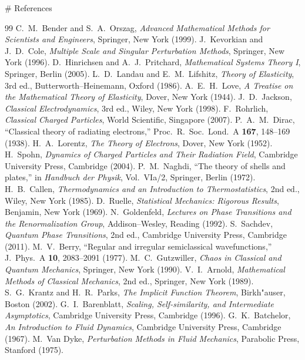 # References
\begin{thebibliography}{99}
C.~M.~Bender and S.~A.~Orszag,
\emph{Advanced Mathematical Methods for Scientists and Engineers},
Springer, New York (1999).
J.~Kevorkian and J.~D.~Cole,
\emph{Multiple Scale and Singular Perturbation Methods},
Springer, New York (1996).
D.~Hinrichsen and A.~J.~Pritchard,
\emph{Mathematical Systems Theory I},
Springer, Berlin (2005).
L.~D.~Landau and E.~M.~Lifshitz,
\emph{Theory of Elasticity},
3rd ed., Butterworth--Heinemann, Oxford (1986).
A.~E.~H.~Love,
\emph{A Treatise on the Mathematical Theory of Elasticity},
Dover, New York (1944).
J.~D.~Jackson,
\emph{Classical Electrodynamics},
3rd ed., Wiley, New York (1998).
F.~Rohrlich,
\emph{Classical Charged Particles},
World Scientific, Singapore (2007).
P.~A.~M.~Dirac,
``Classical theory of radiating electrons,''
Proc.\ R.\ Soc.\ Lond.\ A \textbf{167}, 148--169 (1938).
H.~A.~Lorentz,
\emph{The Theory of Electrons},
Dover, New York (1952).
H.~Spohn,
\emph{Dynamics of Charged Particles and Their Radiation Field},
Cambridge University Press, Cambridge (2004).
P.~M.~Naghdi,
``The theory of shells and plates,''
in \emph{Handbuch der Physik}, Vol.~VIa/2,
Springer, Berlin (1972).
H.~B.~Callen,
\emph{Thermodynamics and an Introduction to Thermostatistics},
2nd ed., Wiley, New York (1985).
D.~Ruelle,
\emph{Statistical Mechanics: Rigorous Results},
Benjamin, New York (1969).
N.~Goldenfeld,
\emph{Lectures on Phase Transitions and the Renormalization Group},
Addison--Wesley, Reading (1992).
S.~Sachdev,
\emph{Quantum Phase Transitions},
2nd ed., Cambridge University Press, Cambridge (2011).
M.~V.~Berry,
``Regular and irregular semiclassical wavefunctions,''
J.\ Phys.\ A \textbf{10}, 2083--2091 (1977).
M.~C.~Gutzwiller,
\emph{Chaos in Classical and Quantum Mechanics},
Springer, New York (1990).
V.~I.~Arnold,
\emph{Mathematical Methods of Classical Mechanics},
2nd ed., Springer, New York (1989).
S.~G.~Krantz and H.~R.~Parks,
\emph{The Implicit Function Theorem},
Birkh"auser, Boston (2002).
G.~I.~Barenblatt,
\emph{Scaling, Self-similarity, and Intermediate Asymptotics},
Cambridge University Press, Cambridge (1996).
G.~K.~Batchelor,
\emph{An Introduction to Fluid Dynamics},
Cambridge University Press, Cambridge (1967).
M.~Van Dyke,
\emph{Perturbation Methods in Fluid Mechanics},
Parabolic Press, Stanford (1975).
\end{thebibliography}
